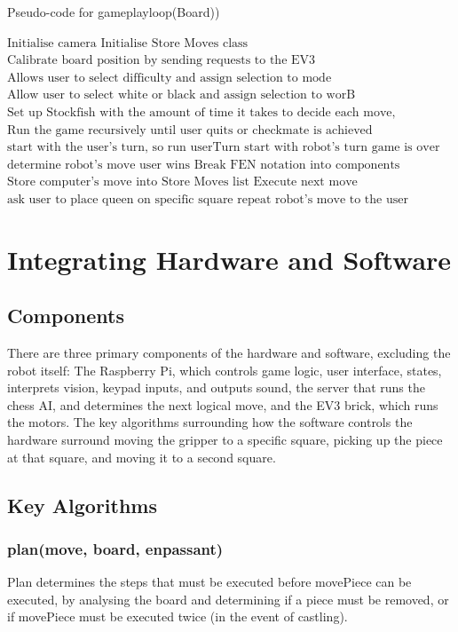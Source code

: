 \documentclass[onecolumn]{IEEEtran}
\begin{document}
\begin{algorithm}[h!]
\caption{Pseudo-code for gameplayloop(Board))}
\begin{algorithmic}[1]
\STATE $\text{Initialise camera}$
\STATE $\text{Initialise Store Moves class}$
\STATE $\text{Calibrate board position by sending requests to the EV3}$
\STATE $\text{Allows user to select difficulty and assign selection to mode}$
\STATE $\text{Allow user to select white or black and assign selection to worB}$
\STATE $\text{Set up Stockfish with the amount of time it takes to decide each move, determined by the difficulty level}$
\STATE $\text{Run the game recursively until user quits or checkmate is achieved}$
\STATE $\text{start with the user's turn, so run userTurn}$
\ELSE
\STATE $\text{start with robot's turn}$
\ENDIF
{}
\STATE $\text{game is over}$
\ELSE
\STATE $\text{determine robot's move}$
	\STATE $\text{user wins}$
	\ELSE
	\STATE $\text{Break FEN notation into components}$
	\STATE $\text{Store computer's move into Store Moves list}$
	\STATE $\text{Execute next move}$
		\STATE $\text{ask user to place queen on specific square}$
		\ENDIF
	\STATE $\text{repeat robot's move to the user}$
	\ENDIF
\ENDIF
\end{algorithmic}
\end{algorithm}


\section{Integrating Hardware and Software}
\subsection{Components}
There are three primary components of the hardware and software, excluding the robot itself: The Raspberry Pi, which controls game logic, user interface, states, interprets vision, keypad inputs, and outputs sound, the server that runs the chess AI, and determines the next logical move, and the EV3 brick, which runs the motors. The key algorithms surrounding how the software controls the hardware surround moving the gripper to a specific square, picking up the piece at that square, and moving it to a second square. 
\subsection{Key Algorithms}


\subsubsection{plan(move, board, enpassant)}
Plan determines the steps that must be executed before movePiece can be executed, by analysing the board and determining if a piece must be removed, or if movePiece must be executed twice (in the event of castling). 
\end{document}
